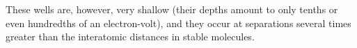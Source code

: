 These wells are, however, very shallow (their depths amount to only tenths or even hundredths of an electron-volt), and they occur at separations several times greater than the interatomic distances in stable molecules.
